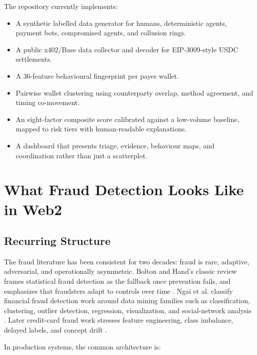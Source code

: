 \documentclass[11pt]{article}
\newcommand{\code}[1]{\texttt{\detokenize{#1}}}
\begin{document}
The repository currently implements:

\begin{itemize}
  \item A synthetic labelled data generator for humans, deterministic agents,
        payment bots, compromised agents, and collusion rings.
  \item A public x402/Base data collector and decoder for EIP-3009-style USDC
        \code{transferWithAuthorization} settlements.
  \item A 36-feature behavioural fingerprint per payer wallet.
  \item Pairwise wallet clustering using counterparty overlap, method
        agreement, and timing co-movement.
  \item An eight-factor composite score calibrated against a low-volume
        baseline, mapped to risk tiers with human-readable explanations.
  \item A dashboard that presents triage, evidence, behaviour maps, and
        coordination rather than just a scatterplot.
\end{itemize}

\section{What Fraud Detection Looks Like in Web2}

\subsection{Recurring Structure}

The fraud literature has been consistent for two decades: fraud is rare,
adaptive, adversarial, and operationally asymmetric.  Bolton and Hand's classic
review frames statistical fraud detection as the fallback once prevention
fails, and emphasizes that fraudsters adapt to controls over time
\cite{bolton2002}.  Ngai et al. classify financial fraud detection work around
data mining families such as classification, clustering, outlier detection,
regression, visualization, and social-network analysis \cite{ngai2011}.
Later credit-card fraud work stresses feature engineering, class imbalance,
delayed labels, and concept drift \cite{bahnsen2016,dalpozzolo2015,carcillo2018}.

In production systems, the common architecture is:
\end{document}
